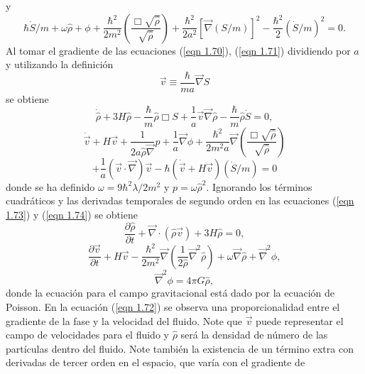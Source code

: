 \documentclass[a4paper,openright,12pt]{book}
\begin{document}
y
\begin{equation}
\hbar \dot{S}/m + \omega\hat{\rho}
+ \phi
+ \frac{\hbar^{2}}{2m^{2}}\left(\frac{\Box\sqrt{\hat{\rho}}}{\sqrt{\hat{\rho}}}\right)
+ \frac{\hbar^{2}}{2a^{2}}[\vec{\nabla}(S/m)]^{2}
- \frac{\hbar^{2}}{2}(\dot{S}/m)^{2} = 0.\label{eqn 1.71}
\end{equation}
Al tomar el gradiente de las ecuaciones (\ref{eqn 1.70}), (\ref{eqn 1.71}) dividiendo por $a$ y utilizando la definición 
\begin{equation}
\vec{v}\equiv \frac{\hbar}{ma}\vec{\nabla}S\label{eqn 1.72}
\end{equation}
se obtiene
\begin{equation}
\dot{\hat{\rho}} + 3H\hat{\rho} - \frac{\hbar}{m}\hat{\rho}\Box S 
+ \frac{1}{a}\vec{v}\vec{\nabla}\hat{\rho} - \frac{\hbar}{m}\hat{\rho}\dot{S} = 0,\label{eqn 1.73}
\end{equation}
\begin{equation*}
\dot{\vec{v}} + H\vec{v} + \frac{1}{2a\hat{\rho}\vec{\nabla}}p 
+ \frac{1}{a}\vec{\nabla}\phi + \frac{\hbar^{2}}{2m^{2}a}\vec{\nabla}
\left(\frac{\Box\sqrt{\hat{\rho}}}{\sqrt{\hat{\rho}}}\right) 
\end{equation*}  
\begin{equation}
+\frac{1}{a}(\vec{v}\cdot\vec{\nabla})\vec{v}-\hbar(\dot{\vec{v}}+H\vec{v})(\dot{S}/m) = 0\label{eqn 1.74}
\end{equation}
donde se ha definido $\omega = 9\hbar^{2}\lambda/2m^{2}$ y $p= \omega\hat{ \rho}^{2}$. 
Ignorando los términos cuadráticos y las derivadas temporales de segundo orden en las ecuaciones (\ref{eqn 1.73}) y (\ref{eqn 1.74}) se obtiene
\begin{equation}
\frac{\partial \hat{\rho}}{\partial t} +
\vec{\nabla}\cdot(\hat{\rho} \vec{v}) + 3H\hat{\rho}=0,\label{eqn 1.75}
\end{equation}
\begin{equation}
\frac{\partial \vec{v}}{\partial t} + H \vec{v}
-\frac{\hbar^{2}}{2m^{2}}\vec{\nabla}\left(\frac{1}{2\hat{\rho}}\vec{\nabla}^{2}\hat{\rho}\right) + \omega\vec{\nabla}\hat{\rho} +\vec{\nabla}^{2}\phi,\label{eqn 1.76}
\end{equation}
\begin{equation}
\vec{\nabla}^{2}\phi = 4\pi G\hat{\rho},\label{eqn 1.77}
\end{equation}
donde la ecuación para el campo gravitacional está dado por la ecuación de Poisson. En la ecuación (\ref{eqn 1.72}) se observa una proporcionalidad entre el gradiente de la fase y la velocidad del fluido. Note que $\vec{v}$ puede representar el campo de velocidades para el fluido y $\hat{\rho}$ será la densidad de número de las partículas dentro del fluido. Note también la existencia de un término extra con derivadas de tercer orden en el espacio, que varía con el gradiente de 
\end{document}
